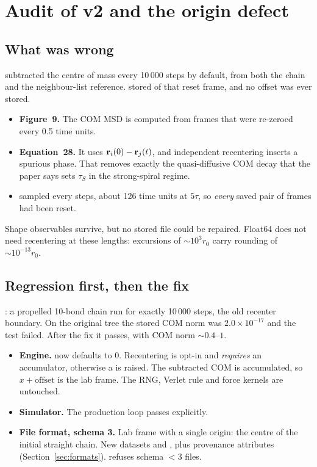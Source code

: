 \documentclass[11pt]{article}
\begin{document}
\section{Audit of v2 and the origin defect}\label{sec:origin}
\subsection{What was wrong}
 subtracted the centre of mass every 10\,000 steps by default, from both the chain and the neighbour-list reference.
 stored  of that reset frame, and no offset was ever stored.
\begin{itemize}
\item \textbf{Figure~9.} The COM MSD is computed from frames that were re-zeroed every 0.5 time units.
\item \textbf{Equation~28.} It uses $\mathbf{r}_i(0)-\mathbf{r}_j(t)$, and independent recentering inserts a spurious phase.
That removes exactly the quasi-diffusive COM decay that the paper says sets $\tau_S$ in the strong-spiral regime.
\item \textbf{} sampled every  steps, about 126 time units at $5\tau$, so \emph{every} saved pair of frames had been reset.
\end{itemize}
Shape observables survive, but no stored file could be repaired. Float64 does not need recentering at these lengths: excursions of $\sim10^3r_0$
carry rounding of $\sim10^{-13}r_0$.

\subsection{Regression first, then the fix}
\begin{okbox}[title=Regression demonstrated on the untouched tree]
: a propelled 10-bond chain run for exactly 10\,000 steps, the old recenter boundary.
On the original tree the stored COM norm was $2.0\times10^{-17}$ and the test failed. After the fix it passes, with COM norm $\sim0.4$--$1$.
\end{okbox}
\begin{itemize}
\item \textbf{Engine.}  now defaults to 0. Recentering is opt-in and \emph{requires} an  accumulator, otherwise a  is raised.
The subtracted COM is accumulated, so $x+\mathrm{offset}$ is the lab frame. The RNG, Verlet rule and force kernels are untouched.
\item \textbf{Simulator.} The production loop passes  explicitly.
\item \textbf{File format, schema 3.} Lab frame with a single origin: the centre of the initial straight chain. New datasets  and , plus provenance attributes (Section~\ref{sec:formats}).
 refuses schema $<3$ files.
\end{itemize}
\end{document}
